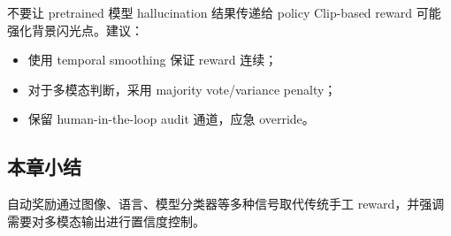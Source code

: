\begin{warningbox}{不要让 pretrained 模型 hallucination 结果传递给 policy}
Clip-based reward 可能强化背景闪光点。建议：
\begin{itemize}
\item 使用 temporal smoothing 保证 reward 连续；\\
\item 对于多模态判断，采用 majority vote/variance penalty；\\
\item 保留 human-in-the-loop audit 通道，应急 override。
\end{itemize}
\end{warningbox}

\subsection{本章小结}
自动奖励通过图像、语言、模型分类器等多种信号取代传统手工 reward，并强调需要对多模态输出进行置信度控制。
\newpage

